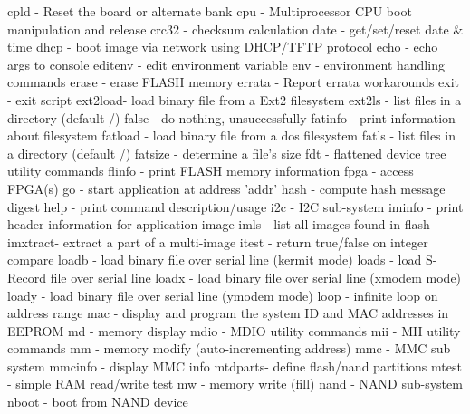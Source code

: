 \documentclass[11pt
  , a4paper
  , article
  , oneside
  , showtrims
]{memoir}
\begin{document}
cpld    - Reset the board or alternate bank
cpu     - Multiprocessor CPU boot manipulation and release
crc32   - checksum calculation
date    - get/set/reset date & time
dhcp    - boot image via network using DHCP/TFTP protocol
echo    - echo args to console
editenv - edit environment variable
env     - environment handling commands
erase   - erase FLASH memory
errata  - Report errata workarounds
exit    - exit script
ext2load- load binary file from a Ext2 filesystem
ext2ls  - list files in a directory (default /)
false   - do nothing, unsuccessfully
fatinfo - print information about filesystem
fatload - load binary file from a dos filesystem
fatls   - list files in a directory (default /)
fatsize - determine a file's size
fdt     - flattened device tree utility commands
flinfo  - print FLASH memory information
fpga    - access FPGA(s)
go      - start application at address 'addr'
hash    - compute hash message digest
help    - print command description/usage
i2c     - I2C sub-system
iminfo  - print header information for application image
imls    - list all images found in flash
imxtract- extract a part of a multi-image
itest   - return true/false on integer compare
loadb   - load binary file over serial line (kermit mode)
loads   - load S-Record file over serial line
loadx   - load binary file over serial line (xmodem mode)
loady   - load binary file over serial line (ymodem mode)
loop    - infinite loop on address range
mac     - display and program the system ID and MAC addresses in EEPROM
md      - memory display
mdio    - MDIO utility commands
mii     - MII utility commands
mm      - memory modify (auto-incrementing address)
mmc     - MMC sub system
mmcinfo - display MMC info
mtdparts- define flash/nand partitions
mtest   - simple RAM read/write test
mw      - memory write (fill)
nand    - NAND sub-system
nboot   - boot from NAND device
\fi
\end{document}
